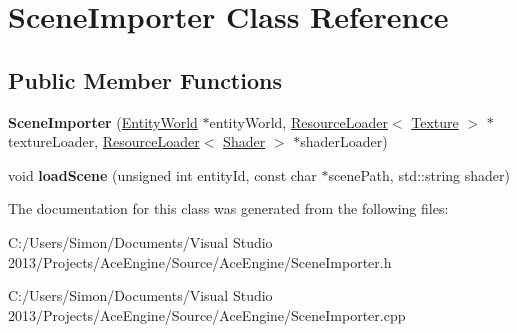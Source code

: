 \hypertarget{class_scene_importer}{}\section{Scene\+Importer Class Reference}
\label{class_scene_importer}
\subsection*{Public Member Functions}
\begin{DoxyCompactItemize}
\item 
\hypertarget{class_scene_importer_a4ea30b104fd5b6532bb9b803288e53b7}{}{\bfseries Scene\+Importer} (\hyperlink{class_entity_world}{Entity\+World} $\ast$entity\+World, \hyperlink{class_resource_loader}{Resource\+Loader}$<$ \hyperlink{struct_texture}{Texture} $>$ $\ast$texture\+Loader, \hyperlink{class_resource_loader}{Resource\+Loader}$<$ \hyperlink{struct_shader}{Shader} $>$ $\ast$shader\+Loader)\label{class_scene_importer_a4ea30b104fd5b6532bb9b803288e53b7}

\item 
\hypertarget{class_scene_importer_a0079dcab3cda85d2a0b0176563a0032b}{}void {\bfseries load\+Scene} (unsigned int entity\+Id, const char $\ast$scene\+Path, std\+::string shader)\label{class_scene_importer_a0079dcab3cda85d2a0b0176563a0032b}

\end{DoxyCompactItemize}


The documentation for this class was generated from the following files\+:\begin{DoxyCompactItemize}
\item 
C\+:/\+Users/\+Simon/\+Documents/\+Visual Studio 2013/\+Projects/\+Ace\+Engine/\+Source/\+Ace\+Engine/Scene\+Importer.\+h\item 
C\+:/\+Users/\+Simon/\+Documents/\+Visual Studio 2013/\+Projects/\+Ace\+Engine/\+Source/\+Ace\+Engine/Scene\+Importer.\+cpp\end{DoxyCompactItemize}
